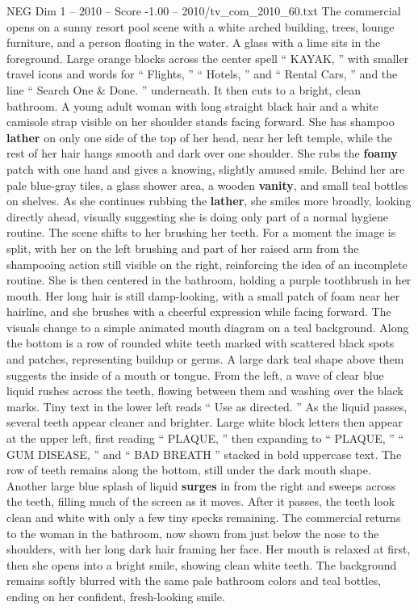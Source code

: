 \begin{textsample}{NEG Dim 1 – 2010 – Score -1.00 – 2010/tv\_com\_2010\_60.txt}  \label{ex:f1_neg_071}
The commercial opens on a sunny resort pool scene with a white arched building, trees, lounge furniture, and a person floating in the water.
A glass with a lime sits in the foreground.
Large orange blocks across the center spell “ KAYAK, ” with smaller travel icons and words for “ Flights, ” “ Hotels, ” and “ Rental Cars, ” and the line “ Search One \& Done. ” underneath.
It then cuts to a bright, clean bathroom.
A young adult woman with long straight black hair and a white camisole strap visible on her shoulder stands facing forward.
She has shampoo \textbf{lather} on only one side of the top of her head, near her left temple, while the rest of her hair hangs smooth and dark over one shoulder.
She rubs the \textbf{foamy} patch with one hand and gives a knowing, slightly amused smile.
Behind her are pale blue-gray tiles, a glass shower area, a wooden \textbf{vanity}, and small teal bottles on shelves.
As she continues rubbing the \textbf{lather}, she smiles more broadly, looking directly ahead, visually suggesting she is doing only part of a normal hygiene routine.
The scene shifts to her brushing her teeth.
For a moment the image is split, with her on the left brushing and part of her raised arm from the shampooing action still visible on the right, reinforcing the idea of an incomplete routine.
She is then centered in the bathroom, holding a purple toothbrush in her mouth.
Her long hair is still damp-looking, with a small patch of foam near her hairline, and she brushes with a cheerful expression while facing forward.
The visuals change to a simple animated mouth diagram on a teal background.
Along the bottom is a row of rounded white teeth marked with scattered black spots and patches, representing buildup or germs.
A large dark teal shape above them suggests the inside of a mouth or tongue.
From the left, a wave of clear blue liquid rushes across the teeth, flowing between them and washing over the black marks.
Tiny text in the lower left reads “ Use as directed. ” As the liquid passes, several teeth appear cleaner and brighter.
Large white block letters then appear at the upper left, first reading “ PLAQUE, ” then expanding to “ PLAQUE, ” “ GUM DISEASE, ” and “ BAD BREATH ” stacked in bold uppercase text.
The row of teeth remains along the bottom, still under the dark mouth shape.
Another large blue splash of liquid \textbf{surges} in from the right and sweeps across the teeth, filling much of the screen as it moves.
After it passes, the teeth look clean and white with only a few tiny specks remaining.
The commercial returns to the woman in the bathroom, now shown from just below the nose to the shoulders, with her long dark hair framing her face.
Her mouth is relaxed at first, then she opens into a bright smile, showing clean white teeth.
The background remains softly blurred with the same pale bathroom colors and teal bottles, ending on her confident, fresh-looking smile.

\end{textsample}
